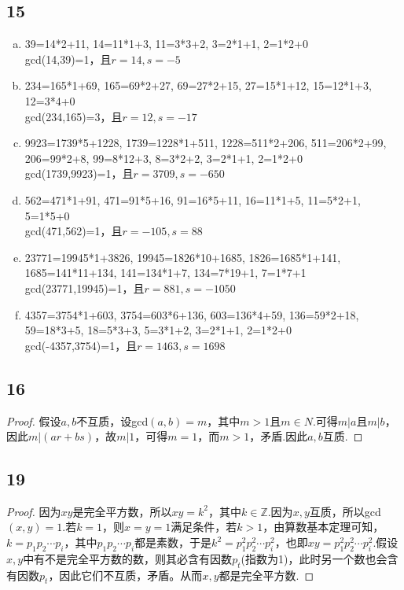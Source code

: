 \documentclass[twocolumn]{article}
\newenvironment{SChinese}{
	\CJKfamily{gbsn}
	\CJKtilde
	\CJKnospace}{}
\begin{document}
\begin{CJK}{UTF8}{}
\begin{SChinese}
				\subsection*{15}
					\begin{enumerate}[(a)]
						\item 39=14*2+11, 14=11*1+3, 11=3*3+2, 3=2*1+1, 2=1*2+0\\gcd(14,39)=1，且$r=14,s=-5$
						\item 234=165*1+69, 165=69*2+27, 69=27*2+15, 27=15*1+12, 15=12*1+3, 12=3*4+0\\gcd(234,165)=3，且$r=12,s=-17$
						\item 9923=1739*5+1228, 1739=1228*1+511, 1228=511*2+206, 511=206*2+99, 206=99*2+8, 99=8*12+3, 8=3*2+2, 3=2*1+1, 2=1*2+0\\gcd(1739,9923)=1，且$r=3709,s=-650$
						\item 562=471*1+91, 471=91*5+16, 91=16*5+11, 16=11*1+5, 11=5*2+1, 5=1*5+0\\gcd(471,562)=1，且$r=-105,s=88$
						\item 23771=19945*1+3826, 19945=1826*10+1685, 1826=1685*1+141, 1685=141*11+134, 141=134*1+7, 134=7*19+1, 7=1*7+1\\gcd(23771,19945)=1，且$r=881,s=-1050$
						\item 4357=3754*1+603, 3754=603*6+136, 603=136*4+59, 136=59*2+18, 59=18*3+5, 18=5*3+3, 5=3*1+2, 3=2*1+1, 2=1*2+0\\gcd(-4357,3754)=1，且$r=1463,s=1698$
					\end{enumerate}
				\subsection*{16}
					\begin{proof}
						假设$a,b$不互质，设gcd$(a,b)=m$，其中$m>1$且$m\in N$.可得$m|a$且$m|b$，因此$m|(ar+bs)$，故$m|1$，可得$m=1$，而$m>1$，矛盾.因此$a,b$互质.
					\end{proof}
				\subsection*{19}
					\begin{proof}
						因为$xy$是完全平方数，所以$xy=k^2$，其中$k\in\mathbb{Z}$.因为$x,y$互质，所以gcd$(x,y)=1$.若$k=1$，则$x=y=1$满足条件，若$k>1$，由算数基本定理可知，$k=p_1p_2\cdots p_i$，其中$p_1p_2\cdots p_i$都是素数，于是$k^2=p_1^2p_2^2\cdots p_i^2$，也即$xy=p_1^2p_2^2\cdots p_i^2$.假设$x,y$中有不是完全平方数的数，则其必含有因数$p_t$(指数为1)，此时另一个数也会含有因数$p_t$，因此它们不互质，矛盾。从而$x,y$都是完全平方数.
					\end{proof}

\end{SChinese}
\end{CJK}
\end{document}
